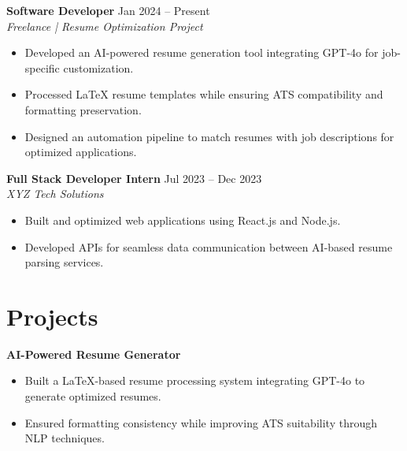 \documentclass[a4paper,10pt]{article}
\begin{document}
\textbf{Software Developer} \hfill Jan 2024 -- Present  \\

\textit{Freelance | Resume Optimization Project}

\begin{itemize}[noitemsep,topsep=0pt]

    \item Developed an AI-powered resume generation tool integrating GPT-4o for job-specific customization.

    \item Processed LaTeX resume templates while ensuring ATS compatibility and formatting preservation.

    \item Designed an automation pipeline to match resumes with job descriptions for optimized applications.

\end{itemize}



\textbf{Full Stack Developer Intern} \hfill Jul 2023 -- Dec 2023  \\

\textit{XYZ Tech Solutions}

\begin{itemize}[noitemsep,topsep=0pt]

    \item Built and optimized web applications using React.js and Node.js.

    \item Developed APIs for seamless data communication between AI-based resume parsing services.

\end{itemize}



\section*{Projects}

\textbf{AI-Powered Resume Generator} 

\begin{itemize}[noitemsep,topsep=0pt]

    \item Built a LaTeX-based resume processing system integrating GPT-4o to generate optimized resumes.

    \item Ensured formatting consistency while improving ATS suitability through NLP techniques.

\end{itemize}
\end{document}
